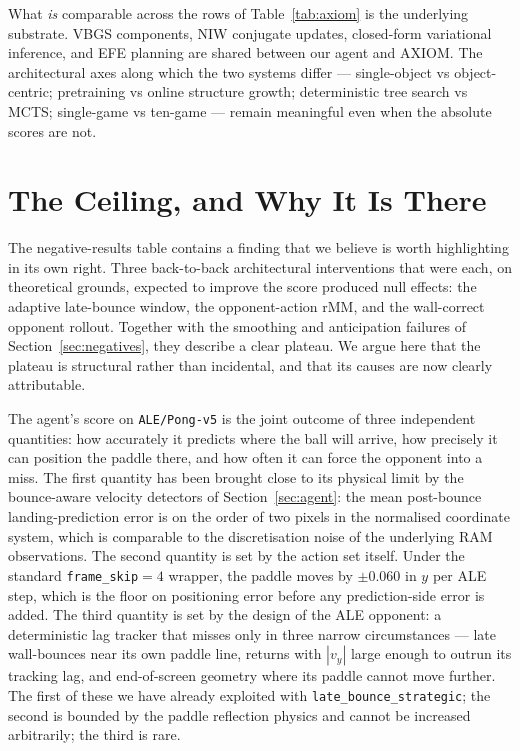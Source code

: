 \documentclass[runningheads]{llncs}
\begin{document}
What \emph{is} comparable across the rows of Table~\ref{tab:axiom}
is the underlying substrate. VBGS components, NIW conjugate
updates, closed-form variational inference, and EFE planning are
shared between our agent and AXIOM. The architectural axes
along which the two systems differ --- single-object vs
object-centric; pretraining vs online structure growth;
deterministic tree search vs MCTS; single-game vs ten-game ---
remain meaningful even when the absolute scores are not.

\section{The Ceiling, and Why It Is There}\label{sec:ceiling}

The negative-results table contains a finding that we believe is
worth highlighting in its own right. Three back-to-back
architectural interventions that were each, on theoretical grounds,
expected to improve the score produced null effects: the adaptive
late-bounce window, the opponent-action rMM, and the wall-correct
opponent rollout. Together with the smoothing and anticipation
failures of Section~\ref{sec:negatives}, they describe a clear
plateau. We argue here that the plateau is structural rather than
incidental, and that its causes are now clearly attributable.

The agent's score on \texttt{ALE/Pong-v5} is the joint outcome of
three independent quantities: how accurately it predicts where the
ball will arrive, how precisely it can position the paddle there,
and how often it can force the opponent into a miss. The first
quantity has been brought close to its physical limit by the
bounce-aware velocity detectors of Section~\ref{sec:agent}: the
mean post-bounce landing-prediction error is on the order of two
pixels in the normalised coordinate system, which is comparable to
the discretisation noise of the underlying RAM observations. The
second quantity is set by the action set itself. Under the standard
\texttt{frame\_skip}$=4$ wrapper, the paddle moves by
$\pm 0.060$ in $y$ per ALE step, which is the floor on positioning
error before any prediction-side error is added. The third quantity
is set by the design of the ALE opponent: a deterministic lag
tracker that misses only in three narrow circumstances --- late
wall-bounces near its own paddle line, returns with $|v_y|$ large
enough to outrun its tracking lag, and end-of-screen geometry where
its paddle cannot move further. The first of these we have already
exploited with \texttt{late\_bounce\_strategic}; the second is
bounded by the paddle reflection physics and cannot be increased
arbitrarily; the third is rare.
\end{document}
